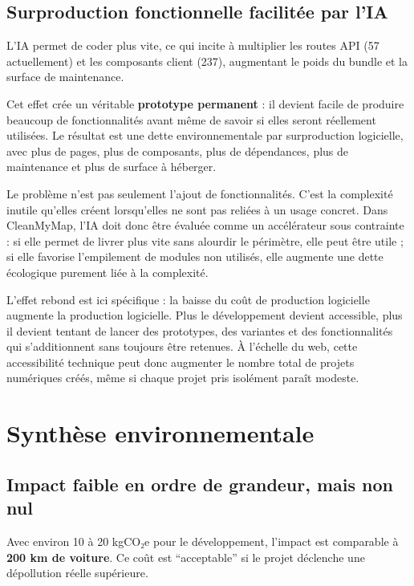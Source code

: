 \documentclass[
  10pt,
  a4paper,
  DIV=11,
  numbers=noendperiod,
  oneside]{scrreprt}
\let\oldtextbf\textbf
\renewcommand{\textbf}[1]{\oldtextbf{\textcolor{cmmnavy}{#1}}}
\begin{document}
\subsection{Surproduction fonctionnelle facilitée par
l'IA}\label{surproduction-fonctionnelle-facilituxe9e-par-lia}

L'IA permet de coder plus vite, ce qui incite à multiplier les routes
API (57 actuellement) et les composants client (237), augmentant le
poids du bundle et la surface de maintenance.

Cet effet crée un véritable \textbf{prototype permanent} : il devient
facile de produire beaucoup de fonctionnalités avant même de savoir si
elles seront réellement utilisées. Le résultat est une dette
environnementale par surproduction logicielle, avec plus de pages, plus
de composants, plus de dépendances, plus de maintenance et plus de
surface à héberger.

Le problème n'est pas seulement l'ajout de fonctionnalités. C'est la
complexité inutile qu'elles créent lorsqu'elles ne sont pas reliées à un
usage concret. Dans CleanMyMap, l'IA doit donc être évaluée comme un
accélérateur sous contrainte : si elle permet de livrer plus vite sans
alourdir le périmètre, elle peut être utile ; si elle favorise
l'empilement de modules non utilisés, elle augmente une dette écologique
purement liée à la complexité.

L'effet rebond est ici spécifique : la baisse du coût de production
logicielle augmente la production logicielle. Plus le développement
devient accessible, plus il devient tentant de lancer des prototypes,
des variantes et des fonctionnalités qui s'additionnent sans toujours
être retenues. À l'échelle du web, cette accessibilité technique peut
donc augmenter le nombre total de projets numériques créés, même si
chaque projet pris isolément paraît modeste.

\section{Synthèse environnementale}\label{synthuxe8se-environnementale}

\subsection{Impact faible en ordre de grandeur, mais non
nul}\label{impact-faible-en-ordre-de-grandeur-mais-non-nul}

Avec environ 10 à 20 kgCO₂e pour le développement, l'impact est
comparable à \textbf{200 km de voiture}. Ce coût est ``acceptable'' si
le projet déclenche une dépollution réelle supérieure.
\end{document}
